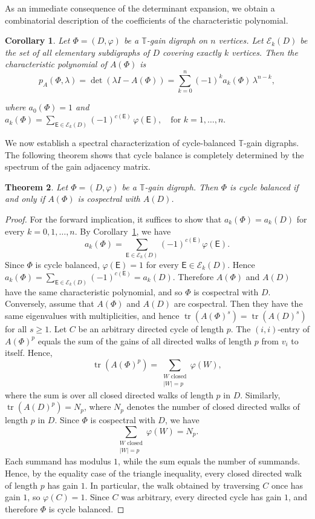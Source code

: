 \documentclass[12pt]{article}
\newtheorem{theorem}{Theorem}[section]
\newtheorem{corollary}[theorem]{Corollary}
\theoremstyle{definition}
\DeclareMathOperator{\tr}{tr}
\newcommand{\TT}{\mathbb{T}}
\newcommand{\vp}{\varphi}
\begin{document}
As an immediate consequence of the determinant expansion, we obtain a combinatorial description of the coefficients of the characteristic polynomial.

\begin{corollary}
  \label{cor:sachs-charpoly}
  Let $\Phi = (D, \varphi)$ be a $\mathbb{T}$-gain digraph on $n$ vertices. Let $\mathcal{E}_k(D)$ be the set of all elementary subdigraphs of $D$ covering exactly $k$ vertices. Then the characteristic polynomial of $A(\Phi)$ is
  \[
    p_A(\Phi, \lambda) = \det(\lambda I - A(\Phi)) = \sum_{k=0}^{n} (-1)^k a_k(\Phi)\,\lambda^{n-k}, \] 
  
  where $ a_0(\Phi) = 1$ and 
  $    a_k(\Phi) = \displaystyle\sum_{\mathsf{E} \in \mathcal{E}_k(D)} (-1)^{c(\mathsf{E})}\,\varphi(\mathsf{E}), \quad \text{for } k=1,\ldots,n.
  $
  
\end{corollary}

We now establish a spectral characterization of cycle-balanced $\TT$-gain digraphs. The following theorem shows that cycle balance is completely determined by the spectrum of the gain adjacency matrix.

\begin{theorem}
  \label{thm:main1}
  Let $\Phi = (D, \vp)$ be a $\TT$-gain digraph. Then $\Phi$ is cycle
  balanced if and only if $A(\Phi)$ is cospectral with $A(D)$.
\end{theorem}

\begin{proof}
For the forward implication, it suffices to show that
$a_k(\Phi)=a_k(D)$ for every $k=0,1,\ldots,n$. By
Corollary~\ref{cor:sachs-charpoly}, we have
\[
a_k(\Phi)=\sum_{\mathsf{E}\in\mathcal{E}_k(D)}(-1)^{c(\mathsf{E})}\vp(\mathsf{E}).
\]
Since $\Phi$ is cycle balanced, $\vp(\mathsf{E})=1$ for every
$\mathsf{E}\in\mathcal{E}_k(D)$. Hence $a_k(\Phi)=\sum_{\mathsf{E}\in\mathcal{E}_k(D)}(-1)^{c(\mathsf{E})}=a_k(D)$.
Therefore $A(\Phi)$ and $A(D)$ have the same characteristic polynomial, and so $\Phi$ is cospectral with $D$. Conversely, assume that $A(\Phi)$ and $A(D)$ are cospectral. Then they have the same eigenvalues with multiplicities, and hence  $\tr(A(\Phi)^s) = \tr(A(D)^s)$ for all $ s \ge 1.$ Let $C$ be an arbitrary directed cycle of length $p$. The $(i,i)$-entry of $A(\Phi)^p$ equals the sum of the gains of all directed  walks of length $p$
from $v_i$ to itself. Hence,
\[
\tr(A(\Phi)^p)=\sum_{\substack{W\text{ closed}\\|W|=p}}\varphi(W),
\]
where the sum is over all closed directed walks of length $p$ in $D$.
Similarly, $\tr(A(D)^p)=N_p$, where $N_p$ denotes the number of closed directed walks of length $p$ in $D$. Since $\Phi$ is cospectral with $D$, we have
\[
\sum_{\substack{W\text{ closed}\\|W|=p}}\varphi(W)=N_p.
\]
Each summand has modulus $1$, while the sum equals the number of summands. Hence, by the equality case of the triangle inequality, every closed directed walk of length $p$ has gain $1$. In particular, the walk obtained by traversing $C$ once has gain $1$, so $\varphi(C)=1$. Since $C$ was arbitrary, every directed cycle has gain $1$, and therefore $\Phi$ is cycle balanced.
\end{proof}
\end{document}
